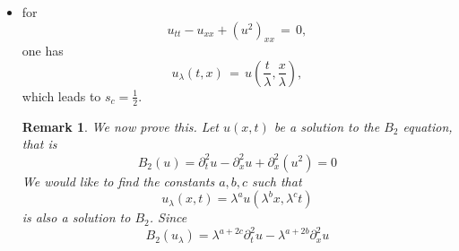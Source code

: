 \documentclass[12pt,reqno]{amsart}
\numberwithin{equation}{section}  %
\newcommand{\nin}{\noindent}
\newcommand{\rr}{\mathbb{R}}
\newcommand{\ci}{\mathbb{T}}
\newcommand{\wh}{\widehat}
\newtheorem{remark}[theorem]{Remark}
\begin{document}
\begin{appendices}
\begin{itemize}
\begin{framed}
\begin{remark}
%
%
\begin{equation*}
\begin{split}
  \| u_{\lambda} \|_{\dot{H}^s(\rr)} 
  & = \lambda^{2} \left( \int_{\rr} | \xi |^{2s} |
  \frac{1}{\lambda}\wh{u(\cdot, \lambda^{2}t)}(\frac{\xi}{\lambda}) |^2 d \xi
  \right)^{1/2}
  \\
  & = \lambda \left( \int_{\rr}| \xi |^{2s} | \wh{u(\cdot,
  \lambda^{2}t)}(\frac{\xi}{\lambda}) |^2 d \xi  \right)^{1/2}
  \\
  & = \lambda \left( \int_{\rr} | \lambda \xi' |^{2s} 
  \wh{u(\cdot, \lambda^{2}t)}(\xi') |^2 \lambda d \xi
  \right)^{1/2}
  \\
  & = \lambda^{s + 3/2} \|u(\cdot, \lambda^{2}t) \|_{\dot{H}^s (\ci)}.
\end{split}
\end{equation*}
%
%
Therefore, $\| u_{\lambda(0)} \|_{\dot{H}^s(\rr)} = \lambda^{s + 3/2} \|
u_{0} \|_{\dot{H}^{s}(\rr)}$. Hence, $s=-3/2$ is the critical Sobolev index.
\end{remark}
\end{framed}
\nin
%
%
\begin{framed}
\begin{remark}
Since the scaling conserves data in $\dot{H}^{-3/2}$, it
seems that this equation is ``like KdV''.
So one may expect KdV type theorems.
That is, $s_c=-3/4$ on the line and $s_c=-1/2$ on the circle,
if one uses bilinear estimates.
But, Kappeler and collaborators went all the way to $-1$ for KdV.
However KdV is integrable. Is this equation integrable?
Also, people conjecture that the critical index for KdV well-posedness 
in some appropriate sense should be the scaling index which is  $-3/2$.
\label{rem:kdv-like}
\end{remark}
\end{framed}
%
%
  \item for 
    \[
    u_{tt}-u_{xx}+(u^2)_{xx}\,=\,0,
    \]
    one has 
    \[
    u_{\lambda}(t,x)\,=\,u\left(\frac{t}{\lambda}, \frac{x}{\lambda}\right),
    \]
    which leads to $s_c=\frac 12$.
\begin{framed}
\begin{remark}
We now prove this. 
Let $u(x, t)$ be a solution to the $B_2$ equation, that is
%
$$
B_2(u)=
 \partial_t^2u - \partial^2_x u + \partial_x^2(u^2)  = 0
$$
%
We would like to find the constants
$a, b, c$ such that
\[
u_\lambda (x, t) = \lambda^a u(\lambda^b x, \lambda^c t)
\]
is also a solution to $B_2$.  Since 
$$
B_2(u_\lambda)=
\lambda^{a+2c} \partial_t^2u 
-
 \lambda^{a+2b} \partial^2_x u 
$$
\end{remark}
\end{framed}
\end{itemize}
\end{appendices}
\end{document}
